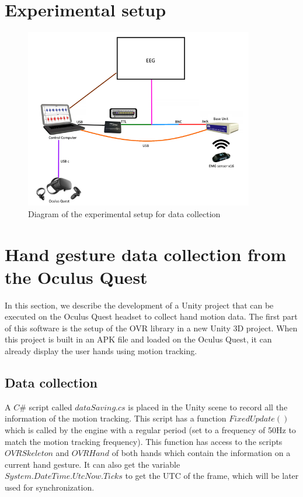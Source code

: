 \documentclass{article}
\begin{document}
\section{Experimental setup}

\begin{figure}[H]
	\centering
	\includegraphics[width=10cm]{images/experimentalSetup.png}
	\caption{Diagram of the experimental setup for data collection}
	\label{fig:experimentalSetup}
\end{figure}


\section{Hand gesture data collection from the Oculus Quest}

In this section, we describe the development of a Unity project that can be executed on the Oculus Quest headset to collect hand motion data. The first part of this software is the setup of the OVR library in a new Unity 3D project. When this project is built in an APK file and loaded on the Oculus Quest, it can already display the user hands using motion tracking.

\subsection{Data collection}

A $C\#$ script called $dataSaving.cs$ is placed in the Unity scene to record all the information of the motion tracking. This script has a function $FixedUpdate()$ which is called by the engine with a regular period (set to a frequency of 50Hz to match the motion tracking frequency). This function has access to the scripts $OVRSkeleton$ and $OVRHand$ of both hands which contain the information on a current hand gesture. It can also get the variable $System.DateTime.UtcNow.Ticks$ to get the UTC of the frame, which will be later used for synchronization.
\end{document}
